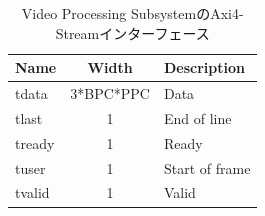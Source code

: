 \begin{table}[htbp]
  \caption{Video Processing SubsystemのAxi4-Streamインターフェース}
  \label{tb:fpga-axi4-stream}
  \begin{center}
  \begin{tabular}{l|c|l}
    \hline
    Name   & Width     & Description \\\hline\hline
    tdata  & 3*BPC\footnotemark[3]*PPC\footnotemark[4] & Data \\\hline
    tlast  & 1         & End of line \\\hline
    tready & 1         & Ready \\\hline
    tuser  & 1         & Start of frame \\\hline
    tvalid & 1         & Valid \\\hline
  \end{tabular}\end{center}
\end{table}









